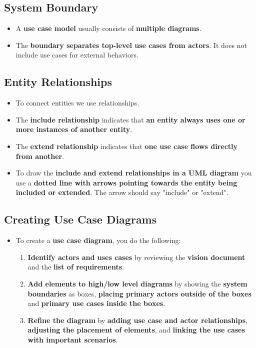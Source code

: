 \documentclass[16pt]{article}
\begin{document}
    \subsection*{System Boundary}
    \begin{itemize}
        \item A \textbf{use case model} usually consists of \textbf{multiple diagrams}.
        \item The \textbf{boundary separates top-level use cases from actors}. It does not include use cases for external behaviors.
    \end{itemize}

    \subsection*{Entity Relationships}
    \begin{itemize}
        \item To connect entities we use relationships.
        \item The \textbf{include relationship} indicates that \textbf{an entity always uses one or more instances of another entity}.
        \item The \textbf{extend relationship} indicates that \textbf{one use case flows directly from another}.
        \item To draw the \textbf{include and extend relationships in a UML diagram} you use a \textbf{dotted line with arrows pointing towards the entity being included or extended}. The arrow should say "include" or "extend". 
    \end{itemize}

    \subsection*{Creating Use Case Diagrams}
    \begin{itemize}
        \item To create a \textbf{use case diagram}, you do the following:
        \begin{enumerate}
            \item \textbf{Identify actors and uses cases} by reviewing the \textbf{vision document} and the \textbf{list of requirements}.
            \item \textbf{Add elements to high/low level diagrams} by showing the \textbf{system boundaries} as boxes, \textbf{placing primary actors outside of the boxes} and \textbf{primary use cases inside the boxes}. 
            \item \textbf{Refine the diagram} by \textbf{adding use case and actor relationships}, \textbf{adjusting the placement of elements}, and \textbf{linking the use cases with important scenarios}.
        \end{enumerate}
    \end{itemize}
\end{document}
